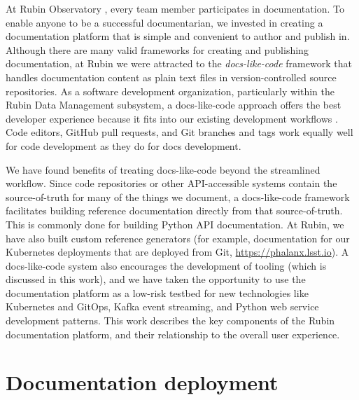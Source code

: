 \documentclass[11pt,twoside]{article}
\begin{document}

At Rubin Observatory \citep{2019ApJ...873..111I}, every team member participates in documentation.
To enable anyone to be a successful documentarian, we invested in creating a documentation platform that is simple and convenient to author and publish in.
Although there are many valid frameworks for creating and publishing documentation, at Rubin we were attracted to the \emph{docs-like-code} \citep{Gentle2022} framework that handles documentation content as plain text files in version-controlled source repositories.
As a software development organization, particularly within the Rubin Data Management subsystem, a docs-like-code approach offers the best developer experience because it fits into our existing development workflows \citep{2018SPIE10707E..09J}.
Code editors, GitHub pull requests, and Git branches and tags work equally well for code development as they do for docs development.

We have found benefits of treating docs-like-code beyond the streamlined workflow.
Since code repositories or other API-accessible systems contain the source-of-truth for many of the things we document, a docs-like-code framework facilitates building reference documentation directly from that source-of-truth.
This is commonly done for building Python API documentation.
At Rubin, we have also built custom reference generators (for example, documentation for our Kubernetes deployments that are deployed from Git, \url{https://phalanx.lsst.io}).
A docs-like-code system also encourages the development of tooling (which is discussed in this work), and we have taken the opportunity to use the documentation platform as a low-risk testbed for new technologies like Kubernetes and GitOps, Kafka event streaming, and Python web service development patterns.
This work describes the key components of the Rubin documentation platform, and their relationship to the overall user experience.

\section{Documentation deployment}

\end{document}
